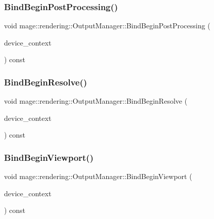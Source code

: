 \subsubsection{\texorpdfstring{Bind\+Begin\+Post\+Processing()}{BindBeginPostProcessing()}}
{\footnotesize\ttfamily void mage\+::rendering\+::\+Output\+Manager\+::\+Bind\+Begin\+Post\+Processing (\begin{DoxyParamCaption}\item[{I\+D3\+D11\+Device\+Context \&}]{device\+\_\+context }\end{DoxyParamCaption}) const\hspace{0.3cm}{\ttfamily [noexcept]}}

\mbox{\label{classmage_1_1rendering_1_1_output_manager_affa0c4b4c9c56807fe8ad4ed802fdfd9}} 
\subsubsection{\texorpdfstring{Bind\+Begin\+Resolve()}{BindBeginResolve()}}
{\footnotesize\ttfamily void mage\+::rendering\+::\+Output\+Manager\+::\+Bind\+Begin\+Resolve (\begin{DoxyParamCaption}\item[{I\+D3\+D11\+Device\+Context \&}]{device\+\_\+context }\end{DoxyParamCaption}) const\hspace{0.3cm}{\ttfamily [noexcept]}}

\mbox{\label{classmage_1_1rendering_1_1_output_manager_a9101e210c5b04fefc52f2f14473c5742}} 
\subsubsection{\texorpdfstring{Bind\+Begin\+Viewport()}{BindBeginViewport()}}
{\footnotesize\ttfamily void mage\+::rendering\+::\+Output\+Manager\+::\+Bind\+Begin\+Viewport (\begin{DoxyParamCaption}\item[{I\+D3\+D11\+Device\+Context \&}]{device\+\_\+context }\end{DoxyParamCaption}) const\hspace{0.3cm}{\ttfamily [noexcept]}}

